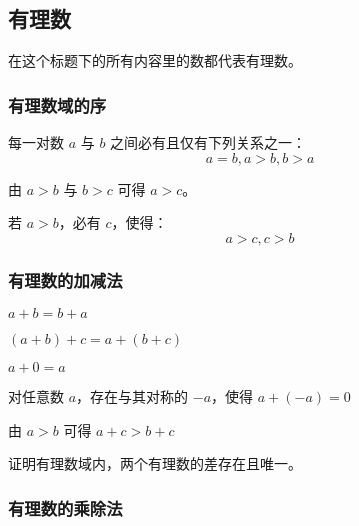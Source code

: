 
\subsection{有理数}

在这个标题下的所有内容里的数都代表有理数。 

\subsubsection{有理数域的序}

\begin{theorem}
每一对数 $a$ 与 $b$ 之间必有且仅有下列关系之一：
$$ a = b, a > b, b > a $$
\end{theorem}

\begin{theorem}
由 $a>b$ 与 $b>c$ 可得 $a>c$。
\end{theorem}

\begin{theorem}
若 $a>b$，必有 $c$，使得：
$$ a > c, c > b $$
\end{theorem}

\subsubsection{有理数的加减法}

\begin{theorem}
$a+b=b+a$ 
\end{theorem}

\begin{theorem}
$(a+b)+c=a+(b+c)$ 
\end{theorem}

\begin{theorem}
$a+0=a$ 
\end{theorem}

\begin{theorem}
对任意数 $a$，存在与其对称的 $-a$，使得 $a+(-a)=0$ 
\end{theorem}

\begin{theorem}
由 $a > b$ 可得 $a+c>b+c$ 
\end{theorem}

\begin{quiz}
证明有理数域内，两个有理数的差存在且唯一。
\end{quiz}

\subsubsection{有理数的乘除法}

